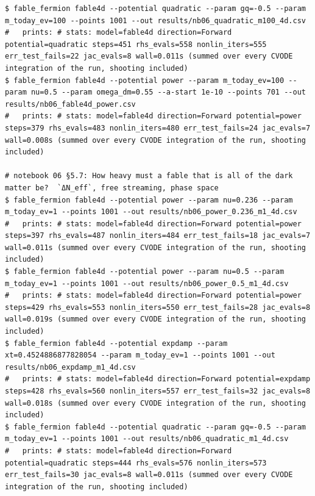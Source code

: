 \begin{Verbatim}
$ fable_fermion fable4d --potential quadratic --param gq=-0.5 --param m_today_ev=100 --points 1001 --out results/nb06_quadratic_m100_4d.csv
#   prints: # stats: model=fable4d direction=Forward potential=quadratic steps=451 rhs_evals=558 nonlin_iters=555 err_test_fails=22 jac_evals=8 wall=0.011s (summed over every CVODE integration of the run, shooting included)
$ fable_fermion fable4d --potential power --param m_today_ev=100 --param nu=0.5 --param omega_dm=0.55 --a-start 1e-10 --points 701 --out results/nb06_fable4d_power.csv
#   prints: # stats: model=fable4d direction=Forward potential=power steps=379 rhs_evals=483 nonlin_iters=480 err_test_fails=24 jac_evals=7 wall=0.008s (summed over every CVODE integration of the run, shooting included)

# notebook 06 §5.7: How heavy must a fable that is all of the dark matter be?  `ΔN_eff`, free streaming, phase space
$ fable_fermion fable4d --potential power --param nu=0.236 --param m_today_ev=1 --points 1001 --out results/nb06_power_0.236_m1_4d.csv
#   prints: # stats: model=fable4d direction=Forward potential=power steps=397 rhs_evals=487 nonlin_iters=484 err_test_fails=18 jac_evals=7 wall=0.011s (summed over every CVODE integration of the run, shooting included)
$ fable_fermion fable4d --potential power --param nu=0.5 --param m_today_ev=1 --points 1001 --out results/nb06_power_0.5_m1_4d.csv
#   prints: # stats: model=fable4d direction=Forward potential=power steps=429 rhs_evals=553 nonlin_iters=550 err_test_fails=28 jac_evals=8 wall=0.019s (summed over every CVODE integration of the run, shooting included)
$ fable_fermion fable4d --potential expdamp --param xt=0.4524886877828054 --param m_today_ev=1 --points 1001 --out results/nb06_expdamp_m1_4d.csv
#   prints: # stats: model=fable4d direction=Forward potential=expdamp steps=428 rhs_evals=560 nonlin_iters=557 err_test_fails=32 jac_evals=8 wall=0.018s (summed over every CVODE integration of the run, shooting included)
$ fable_fermion fable4d --potential quadratic --param gq=-0.5 --param m_today_ev=1 --points 1001 --out results/nb06_quadratic_m1_4d.csv
#   prints: # stats: model=fable4d direction=Forward potential=quadratic steps=444 rhs_evals=576 nonlin_iters=573 err_test_fails=30 jac_evals=8 wall=0.011s (summed over every CVODE integration of the run, shooting included)


\end{Verbatim}
